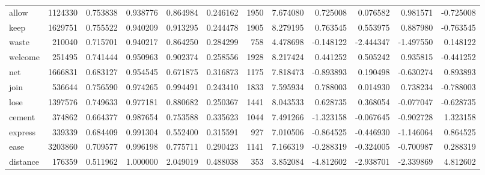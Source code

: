 \begin{tabular}{lrrrrrrrrrrr}
allow     &   1124330 &  0.753838 &      0.938776 &    0.864984 &  0.246162 &  1950 &  7.674080 &  0.725008 &  0.076582 &  0.981571 &     -0.725008 \\
keep      &   1629751 &  0.755522 &      0.940209 &    0.913295 &  0.244478 &  1905 &  8.279195 &  0.763545 &  0.553975 &  0.887980 &     -0.763545 \\
waste     &    210040 &  0.715701 &      0.940217 &    0.864250 &  0.284299 &   758 &  4.478698 & -0.148122 & -2.444347 & -1.497550 &      0.148122 \\
welcome   &    251495 &  0.741444 &      0.950963 &    0.902374 &  0.258556 &  1928 &  8.217424 &  0.441252 &  0.505242 &  0.935815 &     -0.441252 \\
net       &   1666831 &  0.683127 &      0.954545 &    0.671875 &  0.316873 &  1175 &  7.818473 & -0.893893 &  0.190498 & -0.630274 &      0.893893 \\
join      &    536644 &  0.756590 &      0.974265 &    0.994491 &  0.243410 &  1833 &  7.595934 &  0.788003 &  0.014930 &  0.738234 &     -0.788003 \\
lose      &   1397576 &  0.749633 &      0.977181 &    0.880682 &  0.250367 &  1441 &  8.043533 &  0.628735 &  0.368054 & -0.077047 &     -0.628735 \\
cement    &    374862 &  0.664377 &      0.987654 &    0.753588 &  0.335623 &  1044 &  7.491266 & -1.323158 & -0.067645 & -0.902728 &      1.323158 \\
express   &    339339 &  0.684409 &      0.991304 &    0.552400 &  0.315591 &   927 &  7.010506 & -0.864525 & -0.446930 & -1.146064 &      0.864525 \\
ease      &   3203860 &  0.709577 &      0.996198 &    0.775711 &  0.290423 &  1141 &  7.166319 & -0.288319 & -0.324005 & -0.700987 &      0.288319 \\
distance  &    176359 &  0.511962 &      1.000000 &    2.049019 &  0.488038 &   353 &  3.852084 & -4.812602 & -2.938701 & -2.339869 &      4.812602 \\
\bottomrule
\end{tabular}
